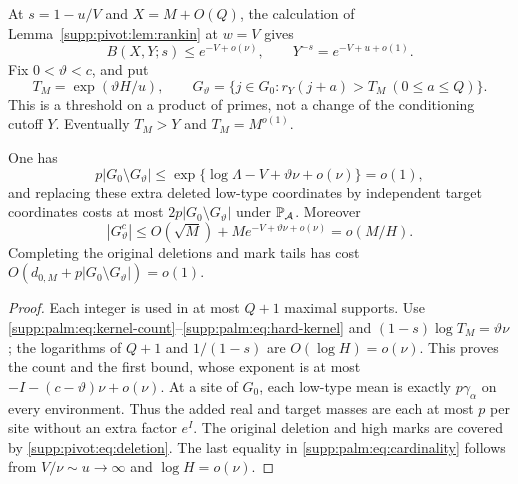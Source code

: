 At $s=1-u/V$ and $X=M+O(Q)$, the calculation of Lemma~\ref{supp:pivot:lem:rankin} at $w=V$ gives
\begin{equation}\label{supp:palm:eq:hard-kernel}
 B(X,Y;s)\le e^{-V+o(\nu)},\qquad
 Y^{-s}=e^{-V+u+o(1)}.
\end{equation}
Fix $0<\vartheta<c$, and put
\begin{equation}\label{supp:palm:eq:strong-good}
 T_M=\exp(\vartheta H/u),\qquad
 G_\vartheta=\{j\in G_0:r_Y(j+a)>T_M\ (0\le a\le Q)\}.
\end{equation}
This is a threshold on a product of primes, not a change of the conditioning cutoff $Y$. Eventually $T_M>Y$ and $T_M=M^{o(1)}$.
\begin{proposition}\label{supp:palm:prop:deletion}
One has
\begin{equation}\label{supp:palm:eq:added-deletion}
 p|G_0\setminus G_\vartheta|
 \le \exp\{\log\Lambda-V+\vartheta\nu+o(\nu)\}=o(1),
\end{equation}
and replacing these extra deleted low-type coordinates by independent target coordinates costs at most $2p|G_0\setminus G_\vartheta|$ under $\mathbb P_{\mathcal A}$. Moreover
\begin{equation}\label{supp:palm:eq:cardinality}
 |G_\vartheta^c|\le O(\sqrt M)+M e^{-V+\vartheta\nu+o(\nu)}
                       =o(M/H).
\end{equation}
Completing the original deletions and mark tails has cost
$O(d_{0,M}+p|G_0\setminus G_\vartheta|)=o(1)$.
\end{proposition}
\begin{proof}
Each integer is used in at most $Q+1$ maximal supports.
Use \eqref{supp:palm:eq:kernel-count}--\eqref{supp:palm:eq:hard-kernel} and
$(1-s)\log T_M=\vartheta\nu$; the logarithms of $Q+1$ and $1/(1-s)$ are $O(\log H)=o(\nu)$. This proves the count and the first bound, whose exponent is at most $-I-(c-\vartheta)\nu+o(\nu)$.
At a site of $G_0$, each low-type mean is exactly $p\gamma_\alpha$ on every environment. Thus the added real and target masses are each at most $p$ per site without an extra factor $e^I$.
The original deletion and high marks are covered by \eqref{supp:pivot:eq:deletion}. The last equality in \eqref{supp:palm:eq:cardinality} follows from $V/\nu\sim u\to\infty$ and $\log H=o(\nu)$.
\end{proof}

